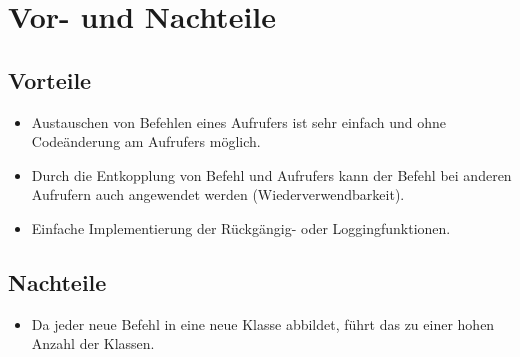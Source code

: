 \section{Vor- und Nachteile}


 \subsection{Vorteile}
\begin{itemize}
\item Austauschen von Befehlen eines Aufrufers ist sehr einfach und ohne Codeänderung am Aufrufers möglich.
\item Durch die Entkopplung von Befehl und Aufrufers kann der Befehl bei anderen Aufrufern auch angewendet werden (Wiederverwendbarkeit).
\item Einfache Implementierung der Rückgängig- oder Loggingfunktionen.
\end{itemize}


\subsection{Nachteile}
\begin{itemize}
\item Da jeder neue Befehl in eine neue Klasse abbildet, führt das zu einer hohen Anzahl der Klassen.
\end{itemize}
